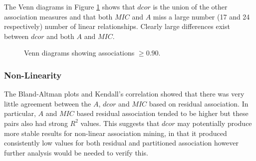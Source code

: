 \documentclass[a4paper, 12pt]{report}
\begin{document}
The Venn diagrams in Figure \ref{F:Venn} shows that $dcor$ is the union of the other association measures and that both $MIC$ and $A$ miss a large number (17 and 24 respectively) number of linear relationships. Clearly large differences exist between $dcor$ and both $A$ and $MIC$. 

\begin{figure}
    \centering
    \qquad
    \caption{Venn diagrams showing associations $\ge 0.90$.}
    \label{F:Venn}
\end{figure}

\subsubsection{Non-Linearity}
The Bland-Altman plots and Kendall's correlation showed that there was very little agreement between the $A$, $dcor$ and $MIC$ based on residual association. In particular, $A$ and $MIC$ based residual association tended to be higher but these pairs also had strong $R^2$ values. This suggests that $dcor$ may potentially produce more stable results for non-linear association mining, in that it produced consistently low values for both residual and partitioned association however further analysis would be needed to verify this.
\end{document}
